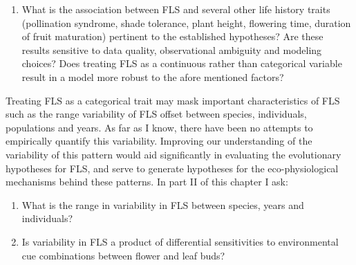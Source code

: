 \documentclass[12pt]{article}\usepackage[]{graphicx}\usepackage[]{color}
\begin{document}
\begin{enumerate}
\item  What is the association between FLS and several other life history traits (pollination syndrome, shade tolerance, plant height, flowering time, duration of fruit maturation) pertinent to the established hypotheses? Are these results sensitive to data quality, observational ambiguity and modeling choices? Does treating FLS as a continuous rather than categorical variable result in a model more robust to the afore mentioned factors?
\end{enumerate}
\indent\indent Treating FLS as a categorical trait may mask important characteristics of FLS such as the range variability of FLS offset between species, individuals, populations and years. As far as I know, there have been no attempts to empirically quantify this variability. Improving our understanding of the variability of this pattern would aid significantly in evaluating the evolutionary hypotheses for FLS, and serve to generate hypotheses for the eco-physiological mechanisms behind these patterns. In part II of this chapter I ask:
\begin{enumerate}
\item What is the range in variability in FLS between species, years and individuals?
\item Is variability in FLS a product of differential sensitivities to environmental cue combinations between flower and leaf buds?
\end{enumerate}
\end{document}
